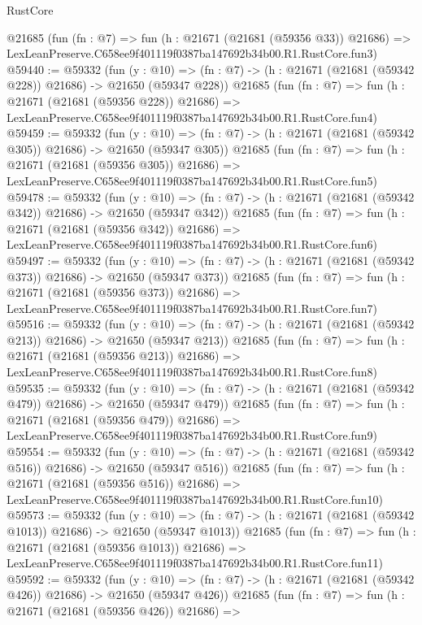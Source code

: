 \begin{lexlean}{RustCore}
\begin{coremodule}
    @21685
    (fun (fn : @7) =>
    fun (h : @21671 (@21681 (@59356 @33)) @21686) =>
    LexLeanPreserve.C658ee9f401119f0387ba147692b34b00.R1.RustCore.fun3)
@59440 := @59332
    (fun (y : @10) =>
    (fn : @7) -> (h : @21671 (@21681 (@59342 @228)) @21686) -> @21650 (@59347 @228))
    @21685
    (fun (fn : @7) =>
    fun (h : @21671 (@21681 (@59356 @228)) @21686) =>
    LexLeanPreserve.C658ee9f401119f0387ba147692b34b00.R1.RustCore.fun4)
@59459 := @59332
    (fun (y : @10) =>
    (fn : @7) -> (h : @21671 (@21681 (@59342 @305)) @21686) -> @21650 (@59347 @305))
    @21685
    (fun (fn : @7) =>
    fun (h : @21671 (@21681 (@59356 @305)) @21686) =>
    LexLeanPreserve.C658ee9f401119f0387ba147692b34b00.R1.RustCore.fun5)
@59478 := @59332
    (fun (y : @10) =>
    (fn : @7) -> (h : @21671 (@21681 (@59342 @342)) @21686) -> @21650 (@59347 @342))
    @21685
    (fun (fn : @7) =>
    fun (h : @21671 (@21681 (@59356 @342)) @21686) =>
    LexLeanPreserve.C658ee9f401119f0387ba147692b34b00.R1.RustCore.fun6)
@59497 := @59332
    (fun (y : @10) =>
    (fn : @7) -> (h : @21671 (@21681 (@59342 @373)) @21686) -> @21650 (@59347 @373))
    @21685
    (fun (fn : @7) =>
    fun (h : @21671 (@21681 (@59356 @373)) @21686) =>
    LexLeanPreserve.C658ee9f401119f0387ba147692b34b00.R1.RustCore.fun7)
@59516 := @59332
    (fun (y : @10) =>
    (fn : @7) -> (h : @21671 (@21681 (@59342 @213)) @21686) -> @21650 (@59347 @213))
    @21685
    (fun (fn : @7) =>
    fun (h : @21671 (@21681 (@59356 @213)) @21686) =>
    LexLeanPreserve.C658ee9f401119f0387ba147692b34b00.R1.RustCore.fun8)
@59535 := @59332
    (fun (y : @10) =>
    (fn : @7) -> (h : @21671 (@21681 (@59342 @479)) @21686) -> @21650 (@59347 @479))
    @21685
    (fun (fn : @7) =>
    fun (h : @21671 (@21681 (@59356 @479)) @21686) =>
    LexLeanPreserve.C658ee9f401119f0387ba147692b34b00.R1.RustCore.fun9)
@59554 := @59332
    (fun (y : @10) =>
    (fn : @7) -> (h : @21671 (@21681 (@59342 @516)) @21686) -> @21650 (@59347 @516))
    @21685
    (fun (fn : @7) =>
    fun (h : @21671 (@21681 (@59356 @516)) @21686) =>
    LexLeanPreserve.C658ee9f401119f0387ba147692b34b00.R1.RustCore.fun10)
@59573 := @59332
    (fun (y : @10) =>
    (fn : @7) -> (h : @21671 (@21681 (@59342 @1013)) @21686) -> @21650 (@59347 @1013))
    @21685
    (fun (fn : @7) =>
    fun (h : @21671 (@21681 (@59356 @1013)) @21686) =>
    LexLeanPreserve.C658ee9f401119f0387ba147692b34b00.R1.RustCore.fun11)
@59592 := @59332
    (fun (y : @10) =>
    (fn : @7) -> (h : @21671 (@21681 (@59342 @426)) @21686) -> @21650 (@59347 @426))
    @21685
    (fun (fn : @7) =>
    fun (h : @21671 (@21681 (@59356 @426)) @21686) =>

\end{coremodule}
\end{lexlean}
